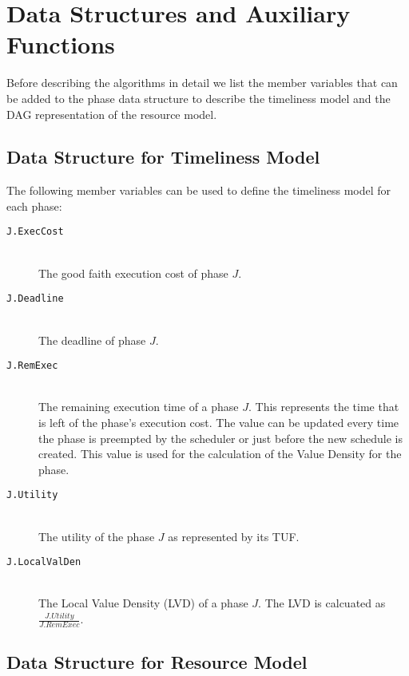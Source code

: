 \documentclass[12pt,dvips]{report}
\begin{document}
\section{Data Structures and Auxiliary Functions}\label{sec:ds-aux}

Before describing the algorithms in detail we list the member variables that can be added to the phase data structure to describe the timeliness model and the DAG representation of the resource model.

\subsection{Data Structure for Timeliness Model}

The following member variables can be used to define the timeliness model for each phase:

\pagebreak

\begin{description}
	\item[\texttt{J.ExecCost}] \hfill \\
		The good faith execution cost of phase $J$.

	\item[\texttt{J.Deadline}] \hfill \\
		The deadline of phase $J$.

	\item[\texttt{J.RemExec}] \hfill \\
		The remaining execution time of a phase $J$. This represents the time that is
		left of the phase's execution cost. The value can be updated every time the
		phase is preempted by the scheduler or just before the new schedule is created.
		This value is used for the calculation of the Value Density for the phase.

	\item[\texttt{J.Utility}] \hfill \\
		The utility of the phase $J$ as represented by its TUF.

	\item[\texttt{J.LocalValDen}] \hfill \\
		The Local Value Density (LVD) of a phase $J$. The LVD is calcuated as $\frac{J.Utility}{J.RemExec}$.
\end{description}


\subsection{Data Structure for Resource Model}
\end{document}
